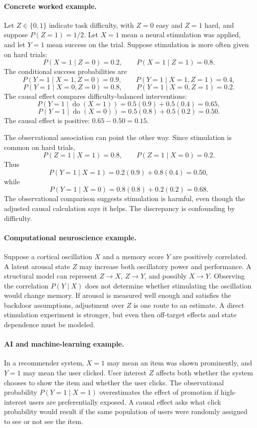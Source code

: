 \paragraph{Concrete worked example.}
Let \(Z\in\{0,1\}\) indicate task difficulty, with \(Z=0\) easy and \(Z=1\) hard, and suppose \(P(Z=1)=1/2\). Let \(X=1\) mean a neural stimulation was applied, and let \(Y=1\) mean success on the trial. Suppose stimulation is more often given on hard trials:
\[
P(X=1\mid Z=0)=0.2,\qquad P(X=1\mid Z=1)=0.8.
\]
The conditional success probabilities are
\[
P(Y=1\mid X=1,Z=0)=0.9,\qquad P(Y=1\mid X=1,Z=1)=0.4,
\]
\[
P(Y=1\mid X=0,Z=0)=0.8,\qquad P(Y=1\mid X=0,Z=1)=0.2.
\]
The causal effect compares difficulty-balanced interventions:
\[
P(Y=1\mid \operatorname{do}(X=1))
=0.5(0.9)+0.5(0.4)=0.65,
\]
\[
P(Y=1\mid \operatorname{do}(X=0))
=0.5(0.8)+0.5(0.2)=0.50.
\]
The causal effect is positive: \(0.65-0.50=0.15\).

The observational association can point the other way. Since stimulation is common on hard trials,
\[
P(Z=1\mid X=1)=0.8,\qquad P(Z=1\mid X=0)=0.2.
\]
Thus
\[
P(Y=1\mid X=1)=0.2(0.9)+0.8(0.4)=0.50,
\]
while
\[
P(Y=1\mid X=0)=0.8(0.8)+0.2(0.2)=0.68.
\]
The observational comparison suggests stimulation is harmful, even though the adjusted causal calculation says it helps. The discrepancy is confounding by difficulty.

\paragraph{Computational neuroscience example.}
Suppose a cortical oscillation \(X\) and a memory score \(Y\) are positively correlated. A latent arousal state \(Z\) may increase both oscillatory power and performance. A structural model can represent \(Z\to X\), \(Z\to Y\), and possibly \(X\to Y\). Observing the correlation \(P(Y\mid X)\) does not determine whether stimulating the oscillation would change memory. If arousal is measured well enough and satisfies the backdoor assumptions, adjustment over \(Z\) is one route to an estimate. A direct stimulation experiment is stronger, but even then off-target effects and state dependence must be modeled.

\paragraph{AI and machine-learning example.}
In a recommender system, \(X=1\) may mean an item was shown prominently, and \(Y=1\) may mean the user clicked. User interest \(Z\) affects both whether the system chooses to show the item and whether the user clicks. The observational probability \(P(Y=1\mid X=1)\) overestimates the effect of promotion if high-interest users are preferentially exposed. A causal effect asks what click probability would result if the same population of users were randomly assigned to see or not see the item.


